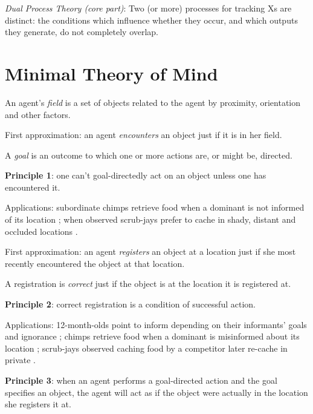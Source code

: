 \documentclass[12pt]{extarticle}
\begin{document}
\begin{multicols*}{3}
\emph{Dual Process Theory (core part)}:
Two (or more) processes for tracking Xs are distinct:
the conditions which influence whether they occur,
and which outputs they generate,
do not completely overlap.



\section{Minimal Theory of Mind}

An agent’s \emph{field} is a set of objects related to the agent by proximity, orientation and other factors.

First approximation: an agent \emph{encounters} an object just if it is in her field.

A \emph{goal} is an outcome to which one or more actions are, or might be, directed.


\textbf{Principle 1}: one can’t goal-directedly act on an object unless one has encountered it.

Applications: subordinate chimps retrieve food when a dominant is not informed of its
          location \citep{Hare:2001ph}; when observed scrub-jays prefer to cache in shady, distant and
          occluded locations \citep{Dally:2004xf,Clayton:2007fh}.

First approximation: an agent \emph{registers} an object at a location just if she most recently encountered the object at that location.

A registration is \emph{correct} just if the object is at the location it is registered at.

\textbf{Principle 2}: correct registration is a condition of successful action.

Applications: 12-month-olds point to inform depending on their informants’ goals and ignorance \citep{Liszkowski:2008al};
          chimps retrieve food when a dominant is misinformed about its location \citep{Hare:2001ph};
          scrub-jays observed caching food by a competitor later re-cache in private \citep{Clayton:2007fh,Emery:2007ze}.

\textbf{Principle 3}: when an agent performs a goal-directed action and the goal specifies an object, the agent will act as if the object were actually in the location she registers it at.


\end{multicols*}
\end{document}
